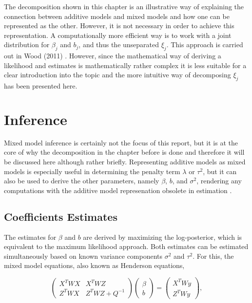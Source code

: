 \documentclass[12pt]{article}
\begin{document}
The decomposition shown in this chapter is an illustrative way of explaining the connection between additive models and mixed models and how one can be represented as the other. However, it is not necessary in order to achieve this representation. A computationally more efficient way is to work with a joint distribution for $\beta_j$ and $b_j$, and thus the unseparated $\xi_j$. This approach is carried out in Wood (2011) \cite{wood2011fast}. However, since the mathematical way of deriving a likelihood and estimates is mathematically rather complex it is less suitable for a clear introduction into the topic and the more intuitive way of decomposing $\xi_j$ has been presented here.







\section{Inference} %

Mixed model inference is certainly not the focus of this report, but it is at the core of why the decomposition in the chapter before is done and therefore it will be discussed here although rather briefly. Representing additive models as mixed models is especially useful in determining the penalty term $\lambda$ or $\tau^2$, but it can also be used to derive the other parameters, namely $\beta$, $b$, and $\sigma^2$, rendering any computations with the additive model represenation obsolete in estimation \cite{fahrmeir2013regression, kneib2006mixed}. 

\subsection{Coefficients Estimates}

The estimates for $\beta$ and $b$ are derived by maximizing the log-posterior, which is equivalent to the maximum likelihood approach. Both estimates can be estimated simultaneously based on known variance components $\sigma^2$ and $\tau^2$. For this, the mixed model equations, also known as Henderson equations, 

$$\begin{pmatrix}
X^TWX & X^TWZ \\
Z^TWX & Z^TWZ + Q^{-1}
\end{pmatrix}
\begin{pmatrix}
\beta\\
b
\end{pmatrix} =
\begin{pmatrix}
X^TWy \\
Z^TWy
\end{pmatrix},\label{henderson}$$
\end{document}
